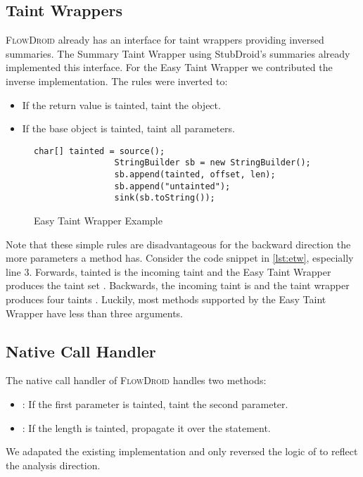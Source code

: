 \documentclass[../draft.tex]{subfiles}
\begin{document}
    \subsection{Taint Wrappers}\label{s:taintwrapper}
    \textsc{FlowDroid} already has an interface  for taint wrappers providing inversed summaries. The Summary Taint Wrapper using StubDroid's summaries already implemented this interface. For the Easy Taint Wrapper we contributed the inverse implementation. The rules were inverted to:
    \begin{itemize}
        \item If the return value is tainted, taint the object.
        \item If the base object is tainted, taint all parameters.
    \end{itemize}

    \begin{figure}[ht]
        \centering
        \begin{adjustbox}{max width=\columnwidth}
            \begin{lstlisting}[gobble=16]
                char[] tainted = source();
                StringBuilder sb = new StringBuilder();
                sb.append(tainted, offset, len);
                sb.append("untainted");
                sink(sb.toString());
            \end{lstlisting}
        \end{adjustbox}
        \caption{Easy Taint Wrapper Example}
        \label{lst:etw}
    \end{figure}

    Note that these simple rules are disadvantageous for the backward direction the more parameters a method has. Consider the code snippet in \autoref{lst:etw}, especially line 3. Forwards, tainted is the incoming taint and the Easy Taint Wrapper produces the taint set . Backwards, the incoming taint is  and the taint wrapper produces four taints . Luckily, most methods supported by the Easy Taint Wrapper have less than three arguments.

    \subsection{Native Call Handler}
    The native call handler of \textsc{FlowDroid} handles two methods:
    \begin{itemize}
        \item {}: If the first parameter is tainted, taint the second parameter.
        \item {}: If the length is tainted, propagate it over the statement.
    \end{itemize}
    We adapated the existing implementation and only reversed the logic of  to reflect the analysis direction.

    
\end{document}
